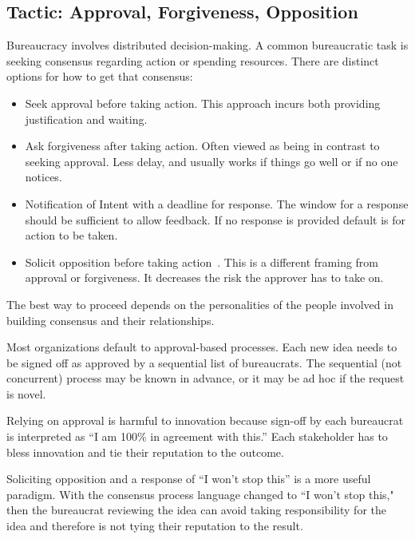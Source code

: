 \subsection*{Tactic: Approval, Forgiveness, Opposition\label{sec:approval-forgiveness-opposition}}

Bureaucracy involves distributed decision-making. 
A common bureaucratic task is seeking consensus regarding action or spending resources. There are distinct options for how to get that consensus:
\begin{itemize}
    \item Seek approval before taking action. This approach incurs both providing justification and waiting.
    \item Ask forgiveness after taking action. Often viewed as being in contrast to seeking approval. Less delay, and usually works if things go well or if no one notices. 
    \item Notification of Intent with a deadline for response. The window for a response should be sufficient to  allow feedback. If no response is provided default is for action to be taken.
    \item Solicit opposition before taking action~\cite{2009_Perr}. This is a different framing from approval or forgiveness. It decreases the risk the approver has to take on.
\end{itemize}
The best way to proceed depends on the personalities of the people involved in building consensus and their relationships. 

Most organizations default to approval-based  processes. Each new idea needs to be signed off as approved by a sequential list of \glspl{bureaucrat}. The sequential (not concurrent) process may be known in advance, or it may be ad hoc if the request is novel.

Relying on approval is harmful to innovation because sign-off by each bureaucrat is interpreted as ``I am 100\% in agreement with this.'' Each stakeholder has to bless innovation and tie their reputation to the outcome.

Soliciting opposition and a response of ``I won't stop this'' is a more useful paradigm. With the consensus process language changed to ``I won't stop this," then the bureaucrat reviewing the idea can avoid taking responsibility for the idea and therefore is not tying their reputation to the result.




